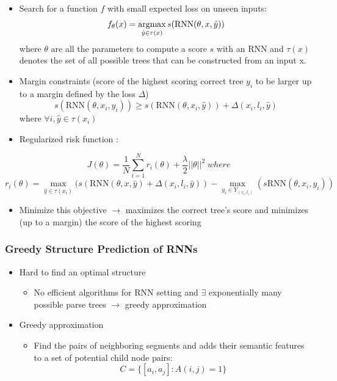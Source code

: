 \documentclass{beamer}
\newcommand{\argmax}{\operatornamewithlimits{argmax}}
\begin{document}
\frame
{
	\begin{itemize}
		\item Search for a function $ f $ with small expected loss on unseen inputs:
		$$ f_{\theta}(x) = \argmax_{\hat{y}\in\tau(x)} s(\text{RNN}(\theta, x, \hat{y}))$$
		where $\theta$ are all the parameters to compute a score $ s $ with an RNN and $ \tau(x) $
		denotes the set of all possible trees that can be constructed from an input x. 
		\item Margin constraints (score of the highest scoring correct tree $y_i$ 
		to be larger up to a margin defined by the loss $ \Delta $)
		$$ s(\text{RNN}(\theta, x_i, y_i)) \geq s(\text{RNN}(\theta, x_i, \hat{y})) + \Delta(x_i, l_i, \hat{y})$$
		where $\forall i, \hat{y} \in \tau(x_i)$
	\end{itemize}
}
\frame
{
	\begin{itemize}
		\item Regularized risk function :
	\end{itemize}
		$$ J(\theta) = \frac{1}{N}\sum_{i=1}^N r_i(\theta) + \frac{\lambda}{2}||\theta||^2 \; where$$
		$$ r_i(\theta) = \max_{\hat{y}\in\tau(x_i)} (s(\text{RNN}(\theta, x, \hat{y}) + \Delta(x_i, l_i, \hat{y})) - 
		\max_{y_i \in Y_{(x_i, l_i)}} (s\text{RNN}(\theta, x_i, y_i)) $$

	\begin{itemize}
		\item Minimize this objective $\rightarrow$ maximizes the correct tree's score and minimizes (up to a margin) 
		the score of the highest scoring 
	\end{itemize}
}
\frame
{
	\frametitle{Greedy Structure Prediction of RNNs}
	\begin{itemize}
		\item Hard to find an optimal structure 
		\begin{itemize}
		\item No efficient algorithms for RNN setting and $\exists$ exponentially 
		many possible parse trees $\rightarrow$ greedy approximation
		\end{itemize}
		\item Greedy approximation 
		\begin{itemize}
		\item Find the pairs of neighboring segments and adds their semantic features to a set of potential child node pairs:
		$$ C = \{[a_i, a_j]: A(i,j) = 1\} $$
		\end{itemize}
	\end{itemize}
}
\frame
\end{document}
